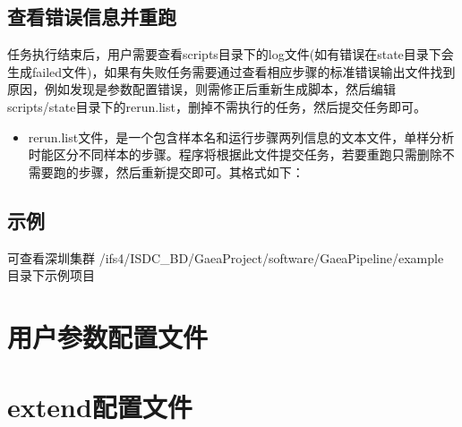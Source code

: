 \documentclass[UTF8,10pt,a4paper]{ctexart}
\begin{document}
\subsection{查看错误信息并重跑}
任务执行结束后，用户需要查看scripts目录下的log文件(如有错误在state目录下会生成failed文件)，如果有失败任务需要通过查看相应步骤的标准错误输出文件找到原因，例如发现是参数配置错误，则需修正后重新生成脚本，然后编辑scripts/state目录下的rerun.list，删掉不需执行的任务，然后提交任务即可。
\begin{itemize}
\item 
rerun.list文件，是一个包含样本名和运行步骤两列信息的文本文件，单样分析时能区分不同样本的步骤。程序将根据此文件提交任务，若要重跑只需删除不需要跑的步骤，然后重新提交即可。其格式如下：

\end{itemize}

\subsection{示例}

可查看深圳集群 /ifs4/ISDC\_BD/GaeaProject/software/GaeaPipeline/example 目录下示例项目



\newpage                                                                                                                                                                          
\begin{appendices}
\renewcommand\appendixpagename{附录}
\renewcommand\appendixtocname{附录}
\appendixpage
\renewcommand\thesection{\Roman{section}}
\renewcommand{\appendixname}{Appendix}

\section{用户参数配置文件}
 \label{B}
 {\color{cyan} }


\newpage
\section{extend配置文件}
  \label{C}
  {\color{cyan} }
  

\end{appendices}
\end{document}

